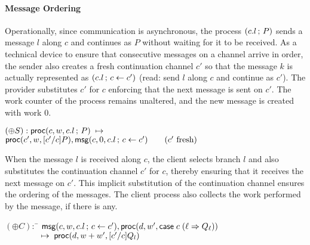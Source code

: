 \paragraph{Message Ordering}
Operationally, since communication is asynchronous, the process
$(c.l \, ; \, P)$ sends a message $l$
along $c$ and continues as $P$ without waiting for it to be received.
As a technical device to ensure that consecutive messages on a
channel arrive in order, the sender also creates a fresh continuation
channel $c'$ so that the message $k$ is actually represented as
$(c.l \, ; \, c \leftarrow c')$ (read: send $l$ along $c$ and
continue as $c'$). The provider substitutes $c'$ for $c$ enforcing
that the next message is sent on $c'$.
The work counter of the process remains unaltered, and the new message
is created with work $0$.
\begin{tabbing}
$(\oplus S) : \mathsf{proc}(c, w, c.l \, ; \, P) \; \mapsto \;$ \\
\qquad $\mathsf{proc}(c', w, [c'/c]P),
\mathsf{msg}(c, 0, c.l \, ; \, c \leftarrow c') \qquad (c' \text{ fresh})$
\end{tabbing}
When the message $l$ is received along $c$, the client selects branch
$l$ and also substitutes the continuation channel $c'$ for $c$, thereby
ensuring that it receives the next message on $c'$. This implicit
substitution of the continuation channel ensures the ordering of the
messages.
The client process also collects the work performed by the message, if
there is any.
\begin{tabbing}
$(\oplus C) :$ \= $\mathsf{msg}(c, w, c.l \, ; \, c \leftarrow c'),
\mathsf{proc}(d, w', \mathsf{case} \; c \; (\ell \Rightarrow Q_\ell))$ \\
$\qquad \qquad \; \mapsto \; \mathsf{proc}(d, w+w',[c'/c]Q_l)$
\end{tabbing}

